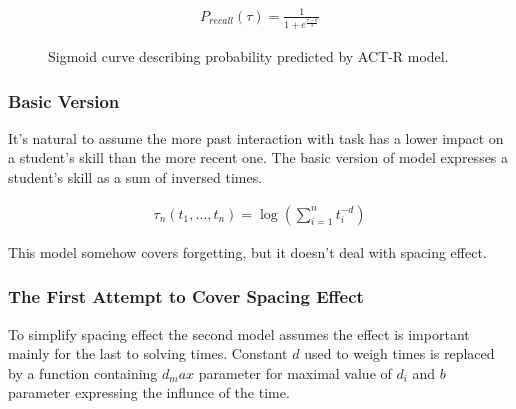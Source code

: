 \documentclass[a4paper]{article}
\begin{document}
\begin{align}
P_{recall}(\tau) = \frac{1}{1 + e^{\frac{\tau - \theta}{s}}}
\end{align}

\begin{figure}[H]
\begin{center}
\end{center}
\label{actr}
\caption{Sigmoid curve describing probability predicted by ACT-R model.}
\end{figure}

\subsubsection{Basic Version}

It's natural to assume the more past interaction with task has a lower impact on a student's skill
than the more recent one. The basic version of model expresses a student's skill as a sum of
inversed times.

\begin{align}
\tau_n(t_1, \ldots, t_n) = \log\left(\sum_{i=1}^{n} t_i^{-d} \right)
\end{align}

This model somehow covers forgetting, but it doesn't deal with spacing effect.

\subsubsection{The First Attempt to Cover Spacing Effect}

To simplify spacing effect the second model assumes the effect is important mainly for the last to
solving times. Constant $d$ used to weigh times is replaced by a function containing $d_max$ parameter for
maximal value of $d_i$ and $b$ parameter expressing the influnce of the time.
\end{document}
